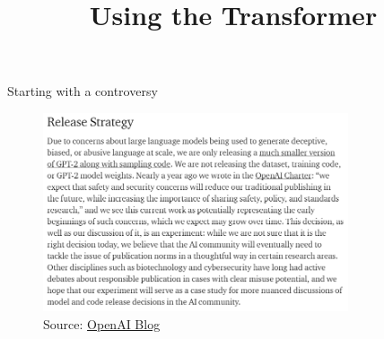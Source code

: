 



\newcommand{\titlefigure}{figure/71-gpt_sq.png}
\newcommand{\learninggoals}{
\item Get a first idea about prompting
\item Understand the implications of such models}

\title{Using the Transformer}
\date{}




\begin{frame}{Starting with a controversy}

\vfill

\begin{figure}
\centering
\includegraphics[width = 9cm]{figure/72-gpt2-release.png}\\ 
\footnotesize{Source:} \href{https://openai.com/blog/better-language-models/\#sample1}{\footnotesize OpenAI Blog}
\end{figure}

\vfill

\end{frame}


